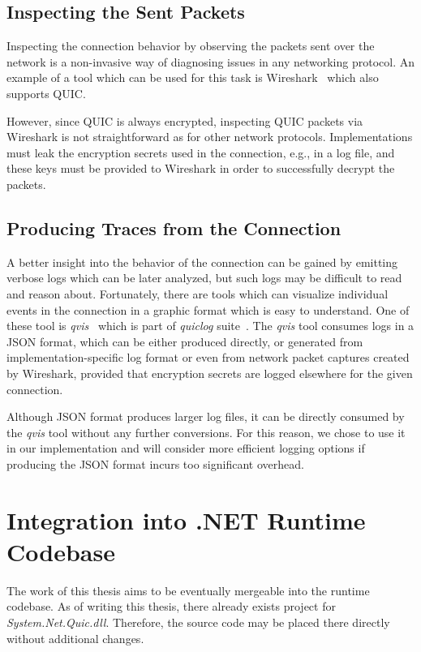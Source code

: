 \subsection{Inspecting the Sent Packets}

Inspecting the connection behavior by observing the packets sent over the network is a non-invasive
way of diagnosing issues in any networking protocol. An example of a tool which can be used for this
task is Wireshark~\cite{web:wireshark} which also supports QUIC.

However, since QUIC is always encrypted, inspecting QUIC packets via Wireshark is not
straightforward as for other network protocols. Implementations must leak the encryption secrets
used in the connection, e.g., in a log file, and these keys must be provided to Wireshark in order
to successfully decrypt the packets.

\subsection{Producing Traces from the Connection}

A better insight into the behavior of the connection can be gained by emitting verbose logs which
can be later analyzed, but such logs may be difficult to read and reason about. Fortunately, there
are tools which can visualize individual events in the connection in a graphic format which is easy
to understand. One of these tool is \textit{qvis}~\cite{web:qvis} which is part of \textit{quiclog}
suite~\cite{githubquiclog}. The \textit{qvis} tool consumes logs in a JSON format, which can be
either produced directly, or generated from implementation-specific log format or even from network
packet captures created by Wireshark, provided that encryption secrets are logged elsewhere for the
given connection.

Although JSON format produces larger log files, it can be directly consumed by the \textit{qvis}
tool without any further conversions. For this reason, we chose to use it in our implementation and
will consider more efficient logging options if producing the JSON format incurs too significant
overhead.

\section{Integration into .NET Runtime Codebase}

The work of this thesis aims to be eventually mergeable into the \dotnet{} runtime codebase. As of
writing this thesis, there already exists project for \textit{System.Net.Quic.dll}. Therefore, the
source code may be placed there directly without additional changes.

